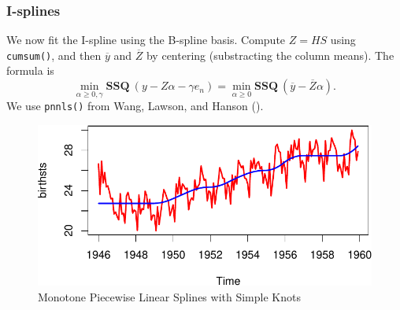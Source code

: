 \documentclass[
  12pt,
  letterpaper,
  DIV=11,
  numbers=noendperiod]{scrreprt}
\newenvironment{Shaded}{\begin{snugshade}}{\end{snugshade}}
\newcommand{\DecValTok}[1]{\textcolor[rgb]{0.68,0.00,0.00}{#1}}
\newcommand{\FunctionTok}[1]{\textcolor[rgb]{0.28,0.35,0.67}{#1}}
\newcommand{\NormalTok}[1]{\textcolor[rgb]{0.00,0.23,0.31}{#1}}
\newcommand{\OtherTok}[1]{\textcolor[rgb]{0.00,0.23,0.31}{#1}}
\newcommand{\SpecialCharTok}[1]{\textcolor[rgb]{0.37,0.37,0.37}{#1}}
\theoremstyle{remark}
\begin{document}
\subsubsection{I-splines}\label{i-splines}

We now fit the I-spline using the B-spline basis. Compute \(Z=HS\) using
\texttt{cumsum()}, and then \(\overline y\) and \(\overline Z\) by
centering (substracting the column means). The formula is \[
\min_{\alpha\geq 0,\gamma}\mathbf{SSQ}\ (y-Z\alpha-\gamma e_n)=\min_{\alpha\geq 0}\mathbf{SSQ}\ (\overline y-\overline Z\alpha).
\] We use \texttt{pnnls()} from Wang, Lawson, and Hanson
().

\begin{Shaded}
\end{Shaded}

\begin{figure}[H]

{\centering \includegraphics{splinical_files/figure-pdf/birthsisplinesplot-1.pdf}

}

\caption{Monotone Piecewise Linear Splines with Simple Knots}

\end{figure}%
\end{document}
